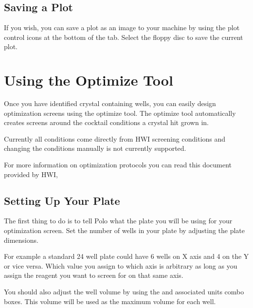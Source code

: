 \documentclass[letterpaper,10pt,english]{sphinxmanual}
\begin{document}
\subsection{Saving a Plot}
\label{\detokenize{user_guide:saving-a-plot}}
If you wish, you can save a plot as an image to your machine by
using the plot control icons at the bottom of the  tab. Select the
floppy disc to save the current plot.


\section{Using the Optimize Tool}
\label{\detokenize{user_guide:using-the-optimize-tool}}
Once you have identified crystal containing wells, you can easily
design optimization screens using the optimize tool. The optimize tool
automatically creates screens around the cocktail conditions a crystal hit
grown in.

Currently all conditions come directly from HWI screening conditions and changing
the conditions manually is not currently supported.

For more information on
optimization protocols you can read this document provided by HWI,

\begin{quote}

\noindent{}
\end{quote}


\subsection{Setting Up Your Plate}
\label{\detokenize{user_guide:setting-up-your-plate}}
The first thing to do is to tell Polo what the plate you will be using for
your optimization screen. Set the number of wells in your plate by adjusting
the plate dimensions.

For example a standard 24 well plate could have 6 wells on X axis and 4 on
the Y or vice versa. Which value you assign to which axis is arbitrary as
long as you assign the reagent you want to screen for on that same axis.

You should also adjust the well volume by using the  and associated
units combo boxes. This volume will be used as the maximum volume for each well.
\end{document}
